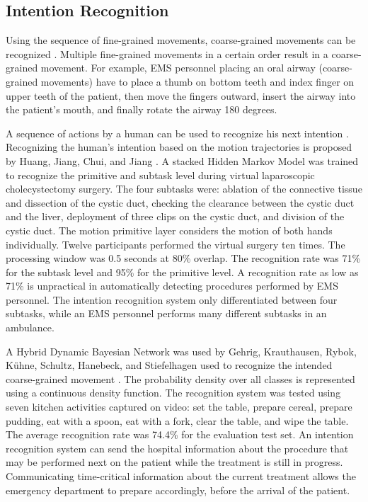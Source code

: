 \subsection{Intention Recognition}
\par Using the sequence of fine-grained movements, coarse-grained movements can be recognized \cite{Dirk2010}. Multiple fine-grained movements in a certain order result in a coarse-grained movement. For example, EMS personnel placing an oral airway (coarse-grained movements) have to place a thumb on bottom teeth and index finger on upper teeth of the patient, then move the fingers outward, insert the airway into the patient's mouth, and finally rotate the airway 180 degrees.
\par A sequence of actions by a human can be used to recognize his next intention \cite{Schrempf2005}. Recognizing the human's intention based on the motion trajectories is proposed by Huang, Jiang, Chui, and Jiang \cite{Yang2017}. A stacked Hidden Markov Model was trained to recognize the primitive and subtask level during virtual laparoscopic cholecystectomy surgery. The four subtasks were: ablation of the connective tissue and dissection of the cystic duct, checking the clearance between the cystic duct and the liver, deployment of three clips on the cystic duct, and division of the cystic duct. The motion primitive layer considers the motion of both hands individually. Twelve participants performed the virtual surgery ten times. The processing window was 0.5 seconds at 80\% overlap. The recognition rate was 71\% for the subtask level and 95\% for the primitive level. A recognition rate as low as 71\% is unpractical in automatically detecting procedures performed by EMS personnel. The intention recognition system only differentiated between four subtasks, while an EMS personnel performs many different subtasks in an ambulance.
\par A Hybrid Dynamic Bayesian Network was used by Gehrig, Krauthausen, Rybok, K{\"{u}}hne, Schultz, Hanebeck, and Stiefelhagen used to recognize the intended coarse-grained movement \cite{Gehrig2011}. The probability density over all classes is represented using a continuous density function. The recognition system was tested using seven kitchen activities captured on video: set the table, prepare cereal, prepare pudding, eat with a spoon, eat with a fork, clear the table, and wipe the table. The average recognition rate was 74.4\% for the evaluation test set. An intention recognition system can send the hospital information about the procedure that may be performed next on the patient while the treatment is still in progress. Communicating time-critical information about the current treatment allows the emergency department to prepare accordingly, before the arrival of the patient.
